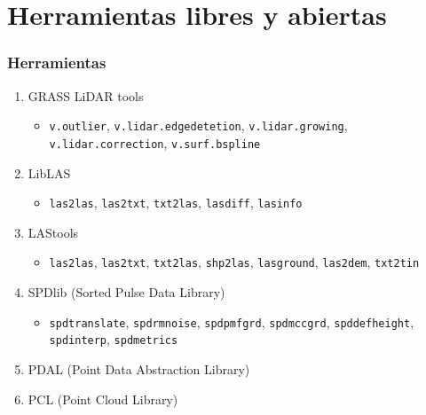 \section{Herramientas libres y abiertas}
\begin{frame}
  \frametitle{Herramientas}
  \begin{enumerate}
    \item GRASS LiDAR tools 
    	\begin{itemize}
        \item \texttt{v.outlier}, \texttt{v.lidar.edgedetetion}, \texttt{v.lidar.growing}, \texttt{v.lidar.correction}, \texttt{v.surf.bspline}
    	\end{itemize}
    \item LibLAS
    	\begin{itemize}
        \item \texttt{las2las}, \texttt{las2txt}, \texttt{txt2las}, \texttt{lasdiff}, \texttt{lasinfo} 
    	\end{itemize}
    \item LAStools
    	\begin{itemize}
        \item \texttt{las2las}, \texttt{las2txt}, \texttt{txt2las}, \texttt{shp2las}, \texttt{lasground}, \texttt{las2dem}, \texttt{txt2tin}
    	\end{itemize}
    \item SPDlib (Sorted Pulse Data Library)
      \begin{itemize}
        \item \texttt{spdtranslate}, \texttt{spdrmnoise}, \texttt{spdpmfgrd}, \texttt{spdmccgrd}, \texttt{spddefheight}, \texttt{spdinterp}, \texttt{spdmetrics}
      \end{itemize}
    \item PDAL (Point Data Abstraction Library)
    \item PCL (Point Cloud Library)
  \end{enumerate}
\end{frame}
